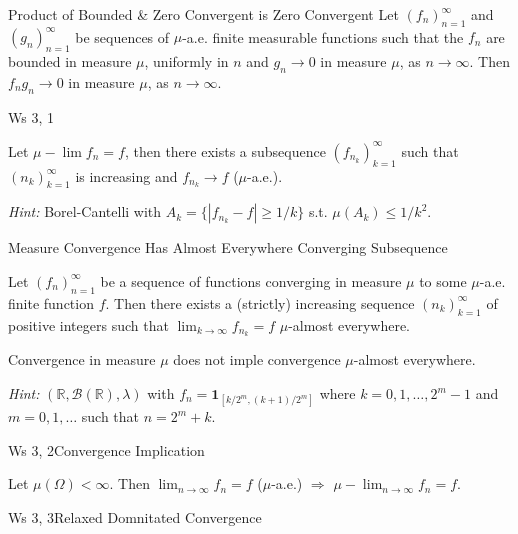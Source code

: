 \documentclass[10pt,landscape]{article}
\renewcommand{\leq}{\leqslant}
\renewcommand{\geq}{\geqslant}
\newcommand{\Hint}{\textit{Hint: }}
\newcommand{\Indicator}[1]{\mathbf{1}_{#1}}
\begin{document}
\begin{multicols}{3}
\begin{exercise}{5.3}{Product of Bounded \& Zero Convergent is Zero Convergent}
    Let $(f_n)_{n=1}^{\infty}$ and $(g_n)_{n=1}^{\infty}$ be sequences of $\mu$-a.e. finite measurable functions such that the $f_n$ are bounded in measure $\mu$, uniformly in $n$ and $g_n \to 0$ in measure $\mu$, as $n \to \infty$. Then $f_ng_n \to 0$ in measure $\mu$, as $n \to \infty$.

\end{exercise}

\begin{exercise}{Ws 3, 1}{}

    Let $\mu-\lim f_n = f$, then there exists a subsequence $(f_{n_k})_{k=1}^{\infty}$ such that $(n_k)_{k=1}^{\infty}$ is increasing and $f_{n_k} \to f$ ($\mu$-a.e.).

    \Hint Borel-Cantelli with $A_k = \{ |f_{n_k} - f| \geq 1/k \}$ s.t. $\mu(A_k) \leq 1/k^2$.

\end{exercise}

\begin{theorem}{5.4}{Measure Convergence Has Almost Everywhere Converging Subsequence}

    Let $(f_n)_{n=1}^{\infty}$ be a sequence of functions converging in measure $\mu$ to some $\mu$-a.e. finite function $f$. Then there exists a (strictly) increasing sequence $(n_k)_{k=1}^{\infty}$ of positive integers such that $\lim_{k \to \infty} f_{n_k} = f$ $\mu$-almost everywhere.

\end{theorem}

\begin{exercise}{5.5}{}

    Convergence in measure $\mu$ does not imple convergence $\mu$-almost everywhere.

    \Hint $(\mathbb{R}, \mathcal{B}(\mathbb{R}), \lambda)$ with $f_n = \Indicator{[k/2^m, (k+1)/2^m]}$ where $k = 0,1,\hdots,2^m - 1$ and $m=0,1,\hdots$ such that $n = 2^m + k$.

\end{exercise}

\begin{exercise}{Ws 3, 2}{Convergence Implication}

    Let $\mu(\Omega) < \infty$. Then $\lim_{n \to \infty} f_n = f$ ($\mu$-a.e.) $\Rightarrow$ $\mu-\lim_{n \to \infty} f_n = f$.

\end{exercise}

\begin{exercise}{Ws 3, 3}{Relaxed Domnitated Convergence}


\end{exercise}
\end{multicols}
\end{document}
